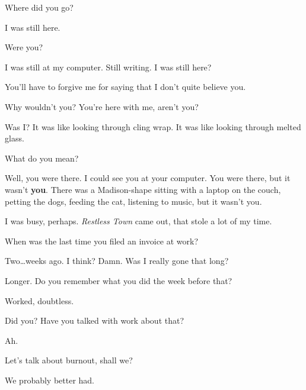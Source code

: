 \label{ally:29}
\begin{paracol}{2}
  \begin{leftcolumn}

\begin{ally}
Where did you go?
\end{ally}
I was still here.

\begin{ally}
Were you?
\end{ally}
I was still at my computer. Still writing. I was still here?

\begin{ally}
You'll have to forgive me for saying that I don't quite believe you.
\end{ally}
Why wouldn't you? You're here with me, aren't you?

\begin{ally}
Was I? It was like looking through cling wrap. It was like looking through melted glass.
\end{ally}
What do you mean?

\begin{ally}
Well, you were there. I could see you at your computer. You were there, but it wasn't \textbf{you}. There was a Madison-shape sitting with a laptop on the couch, petting the dogs, feeding the cat, listening to music, but it wasn't you.
\end{ally}
I was busy, perhaps. \emph{Restless Town} came out, that stole a lot of my time.

\begin{ally}
When was the last time you filed an invoice at work?
\end{ally}
Two\ldots{}weeks ago. I think? Damn. Was I really gone that long?

\begin{ally}
Longer. Do you remember what you did the week before that?
\end{ally}
Worked, doubtless.

\begin{ally}
Did you? Have you talked with work about that?
\end{ally}
Ah.

\begin{ally}
Let's talk about burnout, shall we?
\end{ally}
We probably better had.
\newpage
\end{leftcolumn}
\end{paracol}
